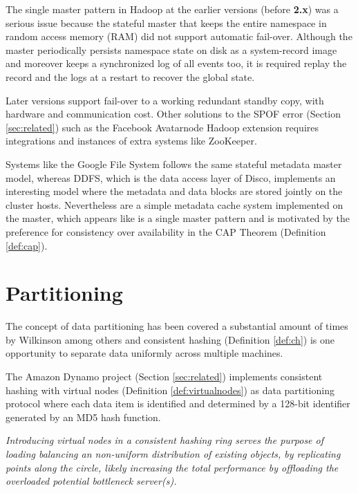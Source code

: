 The single master pattern in Hadoop at the earlier versions (before \textbf{2.x}) was a serious issue because the stateful master that keeps the entire namespace in random access memory (RAM) did not support automatic fail-over. Although the master periodically persists namespace state on disk as a system-record image and moreover keeps a synchronized log of all events too, it is required replay the record and the logs at a restart to recover the global state.

Later versions support fail-over to a working redundant standby copy, with hardware and communication cost. Other solutions to the SPOF error (Section \ref{sec:related}) such as the Facebook Avatarnode Hadoop extension requires integrations and instances of extra systems like ZooKeeper.
\newline

Systems like the Google File System follows the same stateful metadata master model, whereas DDFS, which is the data access layer of Disco, implements an interesting model where the metadata and data blocks are stored jointly on the cluster hosts. Nevertheless are a simple metadata cache system implemented on the master, which appears like is a single master pattern and is motivated by the preference for consistency over availability in the CAP Theorem (Definition \ref{def:cap}).

\section{Partitioning} \label{sec:partitioning}
The concept of data partitioning has been covered a substantial amount of times by Wilkinson \etal \cite{Wilkinson:1998:PPT:289352} among others and consistent hashing (Definition \ref{def:ch}) is one opportunity to separate data uniformly across multiple machines.

The Amazon Dynamo project (Section \ref{sec:related}) implements consistent hashing with virtual nodes (Definition \ref{def:virtualnodes}) as data partitioning protocol where each data item is identified and determined by a 128-bit identifier generated by an MD5 hash function.
\vspace*{3mm}

\begin{definition} \label{def:virtualnodes}
\textit{Introducing virtual nodes in a consistent hashing ring serves the purpose of loading balancing an non-uniform distribution of existing objects, by replicating points along the circle, likely increasing the total performance by offloading the overloaded potential bottleneck server(s).}
\end{definition}
\vspace*{3mm}

